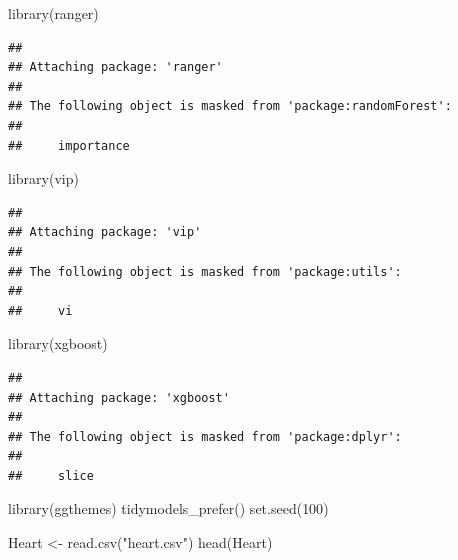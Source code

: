 \documentclass[
]{article}
\newenvironment{Shaded}{\begin{snugshade}}{\end{snugshade}}
\newcommand{\DecValTok}[1]{\textcolor[rgb]{0.00,0.00,0.81}{#1}}
\newcommand{\FunctionTok}[1]{\textcolor[rgb]{0.00,0.00,0.00}{#1}}
\newcommand{\NormalTok}[1]{#1}
\newcommand{\OtherTok}[1]{\textcolor[rgb]{0.56,0.35,0.01}{#1}}
\newcommand{\StringTok}[1]{\textcolor[rgb]{0.31,0.60,0.02}{#1}}
\begin{document}
\begin{Shaded}
\begin{Highlighting}[]
\FunctionTok{library}\NormalTok{(ranger)}
\end{Highlighting}
\end{Shaded}

\begin{verbatim}
## 
## Attaching package: 'ranger'
## 
## The following object is masked from 'package:randomForest':
## 
##     importance
\end{verbatim}

\begin{Shaded}
\begin{Highlighting}[]
\FunctionTok{library}\NormalTok{(vip)}
\end{Highlighting}
\end{Shaded}

\begin{verbatim}
## 
## Attaching package: 'vip'
## 
## The following object is masked from 'package:utils':
## 
##     vi
\end{verbatim}

\begin{Shaded}
\begin{Highlighting}[]
\FunctionTok{library}\NormalTok{(xgboost)}
\end{Highlighting}
\end{Shaded}

\begin{verbatim}
## 
## Attaching package: 'xgboost'
## 
## The following object is masked from 'package:dplyr':
## 
##     slice
\end{verbatim}

\begin{Shaded}
\begin{Highlighting}[]
\FunctionTok{library}\NormalTok{(ggthemes)}
\FunctionTok{tidymodels\_prefer}\NormalTok{()}
\FunctionTok{set.seed}\NormalTok{(}\DecValTok{100}\NormalTok{)}
\end{Highlighting}
\end{Shaded}

\begin{Shaded}
\begin{Highlighting}[]
\NormalTok{Heart }\OtherTok{\textless{}{-}} \FunctionTok{read.csv}\NormalTok{(}\StringTok{"heart.csv"}\NormalTok{) }
\FunctionTok{head}\NormalTok{(Heart)}
\end{Highlighting}
\end{Shaded}
\end{document}
